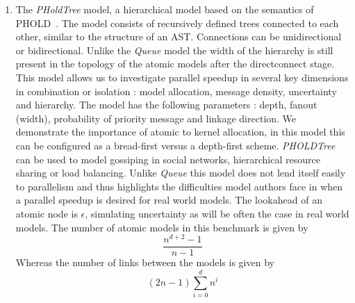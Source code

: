 \begin{enumerate}
	\item The \textit{PHoldTree} model, a hierarchical model based on the semantics of PHOLD~\cite{PHOLD}. The model consists of recursively defined trees connected to each other, similar to the structure of an AST. Connections can be unidirectional or bidirectional.
	Unlike the \textit{Queue} model the width of the hierarchy is still present in the topology of the atomic models after the directconnect stage. This model allows us to investigate parallel speedup in several key dimensions in combination or isolation : model allocation, message density, uncertainty and hierarchy. The model has the following parameters : depth, fanout (width), probability of priority message and linkage direction. We demonstrate the importance of atomic to kernel allocation, in this model this can be configured as a bread-first versus a depth-first scheme.
	\textit{PHOLDTree} can be used to model gossiping in social networks, hierarchical resource sharing or load balancing. Unlike \textit{Queue} this model does not lend itself easily to parallelism and thus highlights the difficulties model authors face in when a parallel speedup is desired for real world models.
	The lookahead of an atomic node is $\epsilon$, simulating uncertainty as will be often the case in real world models.
	The number of atomic models in this benchmark is given by 
	\begin{equation} \label{eq:pholdtreemodelcount}
	\frac{n^{d+2}-1}{n-1}
	\end{equation}
	Whereas the number of links between the models is given by
	\begin{equation} \label{eq:pholdtreelinkcount}
	(2n-1)\sum_{i=0}^{d}{n^i}
	\end{equation}
\end{enumerate}

\newcommand{\modelfraction}{0.65}
\newcommand{\betweenmodels}{0.8cm}

